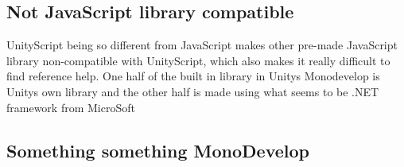 \subsection {Not JavaScript library compatible}
UnityScript being so different from JavaScript makes other pre-made JavaScript library non-compatible with UnityScript, which also makes it really difficult to find reference help. One half of the built in library in Unitys Monodevelop is Unitys own library and the other half is made using what seems to be .NET framework from MicroSoft


\subsection {Something something MonoDevelop}
